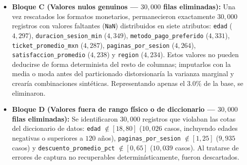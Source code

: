\documentclass[11pt,a4paper]{article}
\newcommand{\code}[1]{\texttt{\small #1}}
\begin{document}
\begin{itemize}[noitemsep]
    Se detectaron $30{,}000$ registros donde el gasto almacenado discrepaba de dicho producto en más de $\$0.05$ MXN ($1{,}034$ casos con $\text{\code{compras\_365d}} = 0$ pero gasto positivo, y $28{,}966$ casos con $\text{\code{compras\_365d}} > 0$ e importe corrompido). Dado que ambos factores (\code{compras\_365d} y \code{ticket\_promedio\_mxn}) estaban presentes y dentro de rango, se recalculó de manera exacta \code{gasto\_total\_365d\_mxn} aplicando la ecuación (1), conservando las $30{,}000$ filas.
    \item \textbf{Bloque C (Valores nulos genuinos --- $30{,}000$ filas eliminadas):}
    Una vez rescatados los formatos monetarios, permanecieron exactamente $30{,}000$ registros con valores faltantes (\code{NaN}) distribuidos en siete atributos: \code{edad} ($4{,}297$), \code{duracion\_sesion\_min} ($4{,}349$), \code{metodo\_pago\_preferido} ($4{,}331$), \code{ticket\_promedio\_mxn} ($4{,}287$), \code{paginas\_por\_sesion} ($4{,}264$), \code{satisfaccion\_promedio} ($4{,}238$) y \code{region} ($4{,}234$). Estos valores no pueden deducirse de forma determinista del resto de columnas; imputarlos con la media o moda antes del particionado distorsionaría la varianza marginal y crearía combinaciones sintéticas. Representando apenas el $3.0\%$ de la base, se eliminaron.
    \item \textbf{Bloque D (Valores fuera de rango físico o de diccionario --- $30{,}000$ filas eliminadas):}
    Se identificaron $30{,}000$ registros que violaban las cotas del diccionario de datos: \code{edad} $\notin [18, 80]$ ($10{,}026$ casos, incluyendo edades negativas o superiores a $120$ años), \code{paginas\_por\_sesion} $\notin [1, 25]$ ($9{,}935$ casos) y \code{descuento\_promedio\_pct} $\notin [0, 65]$ ($10{,}039$ casos). Al tratarse de errores de captura no recuperables determinísticamente, fueron descartados.
\end{itemize}
\end{document}
